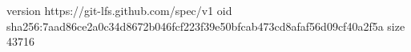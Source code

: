 version https://git-lfs.github.com/spec/v1
oid sha256:7aad86ce2a0c34d8672b046fcf223f39e50bfcab473cd8afaf56d09cf40a2f5a
size 43716
